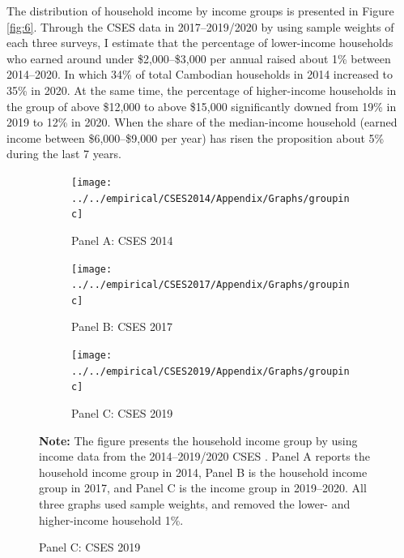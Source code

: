 \documentclass[11pt,letterpaper]{article}
\begin{document}
The distribution of household income by income groups is presented in Figure \ref{fig:6}. Through the CSES data in 2017--2019/2020 by using sample weights of each three surveys, I estimate that the percentage of lower-income households who earned around under \$2,000--\$3,000 per annual raised about 1\% between 2014--2020. In which 34\% of total Cambodian households in 2014 increased to 35\% in 2020. At the same time, the percentage of higher-income households in the group of above \$12,000 to above \$15,000 significantly downed from 19\% in 2019 to 12\% in 2020. When the share of the median-income household (earned income between \$6,000--\$9,000 per year) has risen the proposition about 5\% during the last 7 years. 
\begin{figure}[h]
	\caption{Household income group between 2014--2020}
	\label{fig:6}
	\begin{subfigure}[b]{0.33\linewidth}
		\caption*{Panel A: CSES 2014} \vspace{-.5em}
		\label{fig:3a}
		\texttt{[image: ../../empirical/CSES2014/Appendix/Graphs/groupinc]} 
	\end{subfigure}%
	\hfil
	\begin{subfigure}[b]{0.33\linewidth}
		\caption*{Panel B: CSES 2017} \vspace{-.5em}
		\label{fig:3b}
		\texttt{[image: ../../empirical/CSES2017/Appendix/Graphs/groupinc]} 
	\end{subfigure}
	\hfil
	\begin{subfigure}[b]{0.33\linewidth}
		\caption*{Panel C: CSES 2019} \vspace{-.5em}
		\label{fig:3c}
		\texttt{[image: ../../empirical/CSES2019/Appendix/Graphs/groupinc]} 
	\end{subfigure}
	\begin{tablenotes}
		\footnotesize
		\item \textbf{Note:} The figure presents the household income group by using income data from the 2014--2019/2020 CSES . Panel A reports the household income group in 2014, Panel B is the household income group in 2017, and Panel C is the income group in 2019--2020. All three graphs used sample weights, and removed the lower- and higher-income household 1\%.  
	\end{tablenotes} 
\end{figure}

\end{document}
